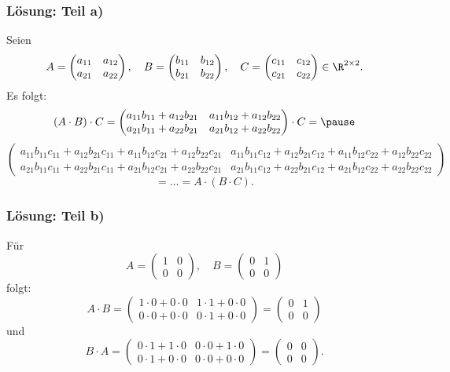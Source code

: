 %
\begin{frame}\frametitle{Lösung: Teil a)}
Seien
		$$
			A 
			=
			\begin{pmatrix}
				a_{11}	&a_{12}	\\
				a_{21}	&a_{22}
			\end{pmatrix}, \quad
			B 
			=
			\begin{pmatrix}
				b_{11}	&b_{12}	\\
				b_{21}	&b_{22}
			\end{pmatrix}, \quad		
			C 
			=
			\begin{pmatrix}
				c_{11}	&c_{12}	\\
				c_{21}	&c_{22}
			\end{pmatrix}
			\in \R^{2\times 2}.		
		$$
		Es folgt:\pause
		$$
			(A\cdot B) \cdot C	
			=
			\begin{pmatrix}
				a_{11}b_{11} + a_{12}b_{21}	&	a_{11}b_{12} + a_{12}b_{22}	\\
				a_{21}b_{11} + a_{22}b_{21}	&	a_{21}b_{12} + a_{22}b_{22}	\\
			\end{pmatrix}
			\cdot C
			= \pause
		$$
		\tiny$$													
			\begin{pmatrix}
				a_{11}b_{11}c_{11} + a_{12}b_{21}c_{11} +  a_{11}b_{12}c_{21} + a_{12}b_{22}c_{21}	
					&	a_{11}b_{11}c_{12} + a_{12}b_{21}c_{12} +  a_{11}b_{12}c_{22} + a_{12}b_{22}c_{22}	\\
				a_{21}b_{11}c_{11} + a_{22}b_{21}c_{11} +  a_{21}b_{12}c_{21} + a_{22}b_{22}c_{21}	
					&	a_{21}b_{11}c_{12} + a_{22}b_{21}c_{12} +  a_{21}b_{12}c_{22} + a_{22}b_{22}c_{22}
			\end{pmatrix}			
		$$\pause
		\normalsize$$
			= \ldots
			= A\cdot(B\cdot C).
		$$
\end{frame}
%
%
\begin{frame}\frametitle{Lösung: Teil b)}
%
F\"ur 
		$$
			A
			=
			\begin{pmatrix}
				1	&	0	\\
				0	&	0
			\end{pmatrix}, \quad			
			B
			=
			\begin{pmatrix}
				0	&	1	\\
				0	&	0
			\end{pmatrix}			
		$$
		folgt:\pause
		$$
			A \cdot B = 	\begin{pmatrix}
				1\cdot0+0\cdot0	&	1\cdot1+0\cdot0	\\
				0\cdot0+0\cdot0	&	0\cdot1+0\cdot0
			\end{pmatrix}=
			\begin{pmatrix}
				0	&	1	\\
				0	&	0
			\end{pmatrix}
		$$\pause
		und
		$$
			B \cdot A = 			\begin{pmatrix}
				0\cdot1+1\cdot0	&	0\cdot0+1\cdot0	\\
				0\cdot1+0\cdot0	&	0\cdot0+0\cdot0
			\end{pmatrix}=
			\begin{pmatrix}
				0	&	0	\\
				0	&	0
			\end{pmatrix}.
		$$		
\end{frame}
